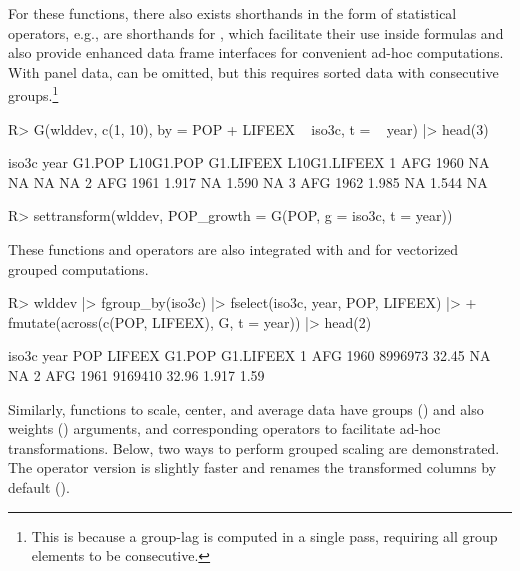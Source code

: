 \documentclass[nojss]{jss} %
\newcommand{\fct}[1]{\code{#1()}}
\begin{document}
%
For these functions, there also exists shorthands in the form of statistical operators, e.g.,  are shorthands for , which facilitate their use inside formulas and also provide enhanced data frame interfaces for convenient ad-hoc computations. With panel data,  can be omitted, but this requires sorted data with consecutive groups.\footnote{This is because a group-lag is computed in a single pass, requiring all group elements to be consecutive.}
%
\begin{Schunk}
\begin{Sinput}
R> G(wlddev, c(1, 10), by = POP + LIFEEX ~ iso3c, t = ~ year) |> head(3)
\end{Sinput}
\begin{Soutput}
  iso3c year G1.POP L10G1.POP G1.LIFEEX L10G1.LIFEEX
1   AFG 1960     NA        NA        NA           NA
2   AFG 1961  1.917        NA     1.590           NA
3   AFG 1962  1.985        NA     1.544           NA
\end{Soutput}
\begin{Sinput}
R> settransform(wlddev, POP_growth = G(POP, g = iso3c, t = year))
\end{Sinput}
\end{Schunk}
%
These functions and operators are also integrated with \fct{fsummarise} and \fct{fmutate} for vectorized grouped computations.
%
\begin{Schunk}
\begin{Sinput}
R> wlddev |> fgroup_by(iso3c) |> fselect(iso3c, year, POP, LIFEEX) |>
+    fmutate(across(c(POP, LIFEEX), G, t = year)) |> head(2)
\end{Sinput}
\begin{Soutput}
  iso3c year     POP LIFEEX G1.POP G1.LIFEEX
1   AFG 1960 8996973  32.45     NA        NA
2   AFG 1961 9169410  32.96  1.917      1.59
\end{Soutput}
\end{Schunk}
%
Similarly, functions to scale, center, and average data have groups () and also weights () arguments, and corresponding operators  to facilitate ad-hoc transformations. Below, two ways to perform grouped scaling are demonstrated. The operator version is slightly faster and renames the transformed columns by default ().
%
\end{document}
